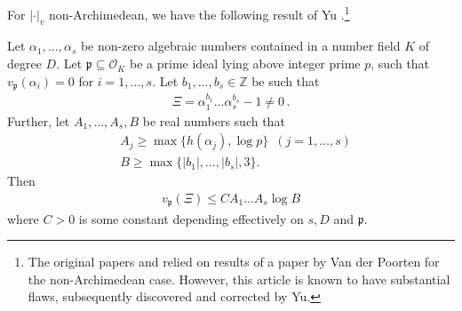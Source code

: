 \documentclass{theoretics}
\newcommand{\p}{\mathfrak{p}}
\newcommand{\Z}{\mathbb{Z}}
\renewcommand{\O}{\mathcal{O}}
\begin{document}
For $|\cdot|_v$ non-Archimedean, we have the following result of Yu \cite[Theorem 1]{yu_p-adic_1999}.\footnote{The original papers \cite{Vereshchagin} and \cite{Mignotte_distance} relied on results of a paper \cite{Van_der_Poorten_1977} by Van der Poorten for the non-Archimedean case. However, this article is known to have substantial flaws, subsequently discovered and corrected by Yu.}
\begin{theorem}[Yu]\label{Yu}
Let $\alpha_1, \dots , \alpha_s$ be non-zero algebraic numbers contained in a number field $K$ of degree $D$. Let $\p \subseteq \O_K$ be a prime ideal lying above integer prime $p$, such that $v_\p(\alpha_i) = 0$ for $i = 1, \dots, s$. Let $b_1,\dots,b_s \in \Z$ be such that
\begin{align*}
    \Xi = \alpha_1^{b_1} \dots \alpha_s^{b_s}-1 \neq 0 \, .
\end{align*}
Further, let $A_1, \dots , A_s, B$ be real numbers such that
\begin{align*}
    &A_j \geq \max\{h(\alpha_j), \log p\} \, \, \, (j=1 , \dots , s) \\
    &B \geq \max \{|b_1| , \dots , |b_s|, 3\}.
\end{align*}
Then
\begin{align*}
    v_\p(\Xi) \leq CA_1 \dots A_s \log B
\end{align*}
where $C>0$ is some constant depending effectively on $s, D$ and  $\p$.
\end{theorem}
\end{document}
